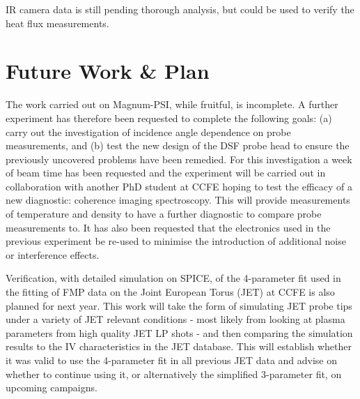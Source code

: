 \documentclass[a4paper, 11pt]{article} %
\begin{document}
	IR camera data is still pending thorough analysis, but could be used to verify the heat flux measurements.


\section{\label{sec:phd}Future Work \& Plan}

	The work carried out on Magnum-PSI, while fruitful, is incomplete.
	A further experiment has therefore been requested to complete the following goals: (a) carry out the investigation of incidence angle dependence on probe measurements, and (b) test the new design of the DSF probe head to ensure the previously uncovered problems have been remedied.
	For this investigation a week of beam time has been requested and the experiment will be carried out in collaboration with another PhD student at CCFE hoping to test the efficacy of a new diagnostic: coherence imaging spectroscopy.
	This will provide measurements of temperature and density to have a further diagnostic to compare probe measurements to. 
	It has also been requested that the electronics used in the previous experiment be re-used to minimise the introduction of additional noise or interference effects.

	Verification, with detailed simulation on SPICE, of the 4-parameter fit used in the fitting of FMP data on the Joint European Torus (JET) at CCFE is also planned for next year.
	This work will take the form of simulating JET probe tips under a variety of JET relevant conditions - most likely from looking at plasma parameters from high quality JET LP shots - and then comparing the simulation results to the IV characteristics in the JET database. 
	This will establish whether it was valid to use the 4-parameter fit in all previous JET data and advise on whether to continue using it, or alternatively the simplified 3-parameter fit, on upcoming campaigns.
\end{document}
